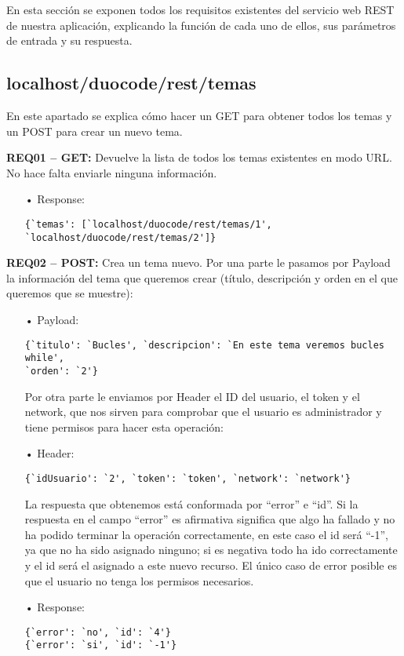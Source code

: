 En esta sección se exponen todos los requisitos existentes del servicio web REST de nuestra aplicación, explicando la función de cada uno de ellos, sus parámetros de entrada y su respuesta.

\subsection{localhost/duocode/rest/temas}
En este apartado se explica cómo hacer un GET para obtener todos los temas y un POST para crear un nuevo tema.

\textbf{REQ01 – GET:} Devuelve la lista de todos los temas existentes en modo URL. No hace falta enviarle ninguna información. 
\begin{itemize}
\item[•] Response:
{\codesize
\begin{verbatim}
{`temas': [`localhost/duocode/rest/temas/1', 
`localhost/duocode/rest/temas/2']}
\end{verbatim}
}
\end{itemize}

\textbf{REQ02 – POST:} Crea un tema nuevo. Por una parte le pasamos por Payload la información del tema que queremos crear (título, descripción y orden en el que queremos que se muestre): 
\begin{itemize}
\item[•]Payload: 
{\codesize
\begin{verbatim}
{`titulo': `Bucles', `descripcion': `En este tema veremos bucles while', 
`orden': `2'} 
\end{verbatim}
}

Por otra parte le enviamos por Header el ID del usuario, el token y el network, que nos sirven para comprobar que el usuario es administrador y tiene permisos para hacer esta operación:
\item[•]Header:
{\codesize
\begin{verbatim}
{`idUsuario': `2', `token': `token', `network': `network'}
\end{verbatim}
}

La respuesta que obtenemos está conformada por ``error'' e ``id''. Si la respuesta en el campo ``error'' es afirmativa significa que algo ha fallado y no ha podido terminar la operación correctamente, en este caso el id será ``-1'', ya que no ha sido asignado ninguno; si es negativa todo ha ido correctamente y el id será el asignado a este nuevo recurso. El único caso de error posible es que el usuario no tenga los permisos necesarios.
\item[•]Response:
{\codesize
\begin{verbatim}
{`error': `no', `id': `4'}
{`error': `si', `id': `-1'}
\end{verbatim}
}
\end{itemize}

